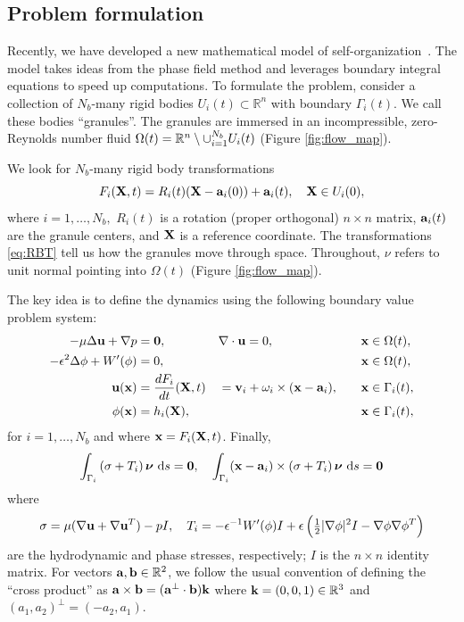 \subsection{Problem formulation}
Recently, we have developed a new mathematical model of
self-organization~\cite{FuQuRyYo22,fu-ryh-qua-you2022,Fu2018_SIAM}. The
model takes ideas from the phase field method and leverages boundary
integral equations to speed up computations. To formulate the problem,
consider a collection of $N_b$-many rigid bodies $U_i(t) \subset \mathbb{R}^n$
with boundary $\Gamma_i(t)$.
We call these bodies ``granules''.
The granules are immersed 
in an incompressible, zero-Reynolds number fluid
$\Omega(t) = \RR^n \setminus \cup_{i=1}^{N_b} U_i(t)$
(Figure \ref{fig:flow_map}).

We look for $N_b$-many rigid body transformations
\begin{equation}
\label{eq:RBT}
F_i(\XX,t) = R_i(t)(\XX - \aa_i(0)) + \aa_i(t),\quad \XX \in U_i(0),
\end{equation}
where $i = 1,\ldots,N_b,$
$R_i(t)$ is a rotation (proper orthogonal) $n \times n$ matrix,
$\aa_i(t)$ are the granule centers, and $\XX$ is a reference coordinate.
The transformations \eqref{eq:RBT} tell us how the granules move through space.
Throughout, $\nu$ refers to unit normal pointing into $\Omega(t)$ (Figure \ref{fig:flow_map}).

The key idea is to define the dynamics using the following
boundary value problem system:
\begin{alignat}{4}
  -\mu\Delta \uu + \nabla p &= \mathbf{0}, 
  && \nabla \cdot \uu = 0, && \quad \xx \in \Omega(t), \label {eqn:stokes} \\
  \label{eqn:phase}
  -\epsilon^2 \Delta \phi + W'(\phi) &= 0, && &&\quad \xx \in \Omega(t),\\
\label{eqn:noslip}        
\uu(\xx) &= \frac{dF_i}{dt}(\XX,t)
&&=\vv_i + \omega_i \times (\xx - \aa_i), 
&&\quad \xx \in \Gamma_i(t),\\
\label{eqn:material}
\phi(\xx) &= h_i(\XX), &&  &&\quad \xx \in \Gamma_i(t),
\end{alignat}
for $i=1,\ldots,N_b$
and where $\xx = F_i(\XX,t)$.
Finally,
\begin{equation}
\label{eqn:stressbalance}
\int_{\Gamma_i} \left(\sigma  + T_i\right)\nnu \,\dif s = \mathbf{0},\quad
\int_{\Gamma_i} (\xx - \aa_i)\times \left(\sigma + T_i\right) \nnu \,\dif s = \mathbf{0}
\end{equation}
where
\begin{equation}
\label{eqn:hydro_stress}
\sigma = \mu(\nabla \uu + \nabla \uu^T) - pI,\quad 
T_i = -\epsilon^{-1} W'(\phi)I
  + \epsilon\left(\tfrac{1}{2}|\nabla \phi|^2I - \nabla \phi \nabla
  \phi^T\right)
\end{equation}
are the hydrodynamic and phase stresses, respectively; 
$I$ is the $n\times n$ identity matrix.
For vectors $\aa, \bb \in \mathbb{R}^2$,
we follow the usual convention of defining
the ``cross product'' as
$\aa \times \bb = (\aa^{\perp} \cdot \bb) \kk$
where $\kk = (0,0,1) \in \mathbb{R}^3$ and $(a_1,a_2)^{\perp} = (-a_2,a_1)$.

